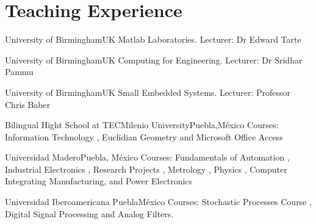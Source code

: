 \documentclass[10pt,a4paper,roman]{moderncv}
\begin{document}
\nocite{*}





\section{Teaching Experience}
{University of Birmingham}{UK}{}
{Matlab Laboratories. Lecturer: Dr Edward Tarte }

{University of Birmingham}{UK}{}
{Computing for Engineering. Lecturer: Dr Sridhar Pammu}

{University of Birmingham}{UK}{}
{Small Embedded Systems. Lecturer: Professor Chris Baber}

{Bilingual Hight School at TECMilenio University}{Puebla,M\'exico}{}
{Courses:
Information Technology \href{https://sites.google.com/site/perezxochicale/teaching/iit}{\faExternalLink},
Euclidian Geometry  \href{https://sites.google.com/site/perezxochicale/teaching/euclidean-geometry}{\faExternalLink}
and
Microsoft Office Access \href{https://sites.google.com/site/perezxochicale/teaching/moa}{\faExternalLink}
}

{Universidad Madero}{Puebla, M\'exico}{}
{Courses: Fundamentals of Automation
\href{https://sites.google.com/site/perezxochicale/digital-electronics}{\faExternalLink},
Industrial Electronics \href{https://sites.google.com/site/perezxochicale/ie}{\faExternalLink},
Research Projects \href{https://sites.google.com/site/perezxochicale/latex/thesistemplate}{\faExternalLink},
Metrology \href{https://sites.google.com/site/perezxochicale/metrology}{\faExternalLink},
Physics \href{http://goo.gl/fffnG}{\faExternalLink},
Computer Integrating Manufacturing, and Power Electronics
}

{Universidad Iberoamericana Puebla}{M\'exico}{}
{Courses: Stochastic Processes Course
\href{https://sites.google.com/site/perezxochicale/stochastic-processes-course}{\faExternalLink},
Digital Signal Processing
\href{https://sites.google.com/site/perezxochicale/digital-signal-processing-course}{\faExternalLink}
and Analog Filters.
}
\end{document}
